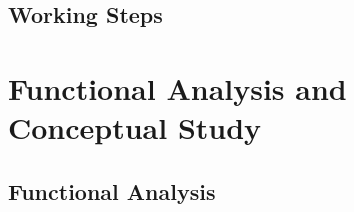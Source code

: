\subsection{Working Steps}
\begin{frame}[fragile=singleslide]{\insertsectionhead}
  \framesubtitle{\insertsubsectionhead}
  \begin{figure}[b]
  \end{figure}
\end{frame}

\section{Functional Analysis and Conceptual Study}
\subsection{Functional Analysis}
\begin{frame}[fragile=singleslide]{\insertsectionhead}
  \framesubtitle{\insertsubsectionhead}
  \begin{figure}[b]
  \end{figure}
\end{frame}


